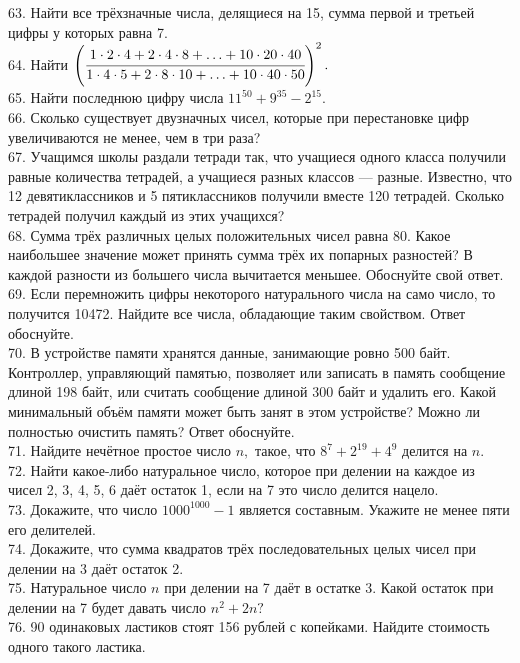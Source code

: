 63. Найти все трёхзначные числа, делящиеся на 15, сумма первой и третьей цифры у которых равна 7.\\
64. Найти $\left( \cfrac{1\cdot2\cdot4+2\cdot4\cdot8+\ldots+10\cdot20\cdot40}{1\cdot4\cdot5+2\cdot8\cdot10+\ldots+10\cdot40\cdot50}\right)^2.$\\
65. Найти последнюю цифру числа $11^{50}+9^{35}-2^{15}.$\\
66. Сколько существует двузначных чисел, которые при перестановке цифр увеличиваются не менее, чем в три раза?\\
67. Учащимся школы раздали тетради так, что учащиеся одного класса получили равные количества тетрадей, а учащиеся разных классов --- разные. Известно, что 12 девятиклассников и 5 пятиклассников получили вместе 120 тетрадей. Сколько тетрадей получил каждый из этих учащихся?\\
68. Сумма трёх различных целых положительных чисел равна 80. Какое наибольшее значение может принять сумма трёх их попарных разностей? В каждой разности из большего числа вычитается меньшее. Обоснуйте свой ответ.\\
69. Если перемножить цифры некоторого натурального числа на само число, то получится 10472. Найдите все числа, обладающие таким свойством. Ответ обоснуйте.\\
70. В устройстве памяти хранятся данные, занимающие ровно 500 байт. Контроллер, управляющий памятью, позволяет или записать в память сообщение длиной 198 байт, или считать сообщение длиной 300 байт и удалить его. Какой минимальный объём памяти может быть занят в этом устройстве? Можно ли полностью очистить память? Ответ обоснуйте.\\
71. Найдите нечётное простое число $n,$ такое, что $8^7+2^{19}+4^9$ делится на $n.$\\
72. Найти какое-либо натуральное число, которое при делении на каждое из чисел 2, 3, 4, 5, 6 даёт остаток 1, если на 7 это число делится нацело.\\
73. Докажите, что число $1000^{1000}-1$ является составным. Укажите не менее пяти его делителей.\\
74. Докажите, что сумма квадратов трёх последовательных целых чисел при делении на 3 даёт остаток 2.\\
75. Натуральное число $n$ при делении на 7 даёт в остатке 3. Какой остаток при делении на 7 будет давать число $n^2+2n?$\\
76. 90 одинаковых ластиков стоят 156 рублей с копейками. Найдите стоимость одного такого ластика.\\
